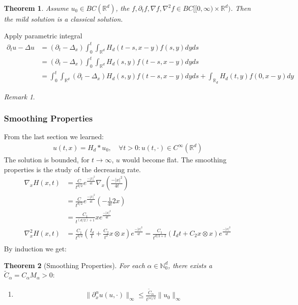 \documentclass[a4paper,11pt,oneside,fleqn]{book}
\newtheorem{theorem}{Theorem}[section]
\theoremstyle{definition}
\theoremstyle{remark}
\newtheorem*{remark}{Remark}
\begin{document}
\begin{theorem}
	Assume $u_0 \in BC(\mathbb{R}^d)$, the $f, \partial_t f, \nabla f, \nabla^2 f \in BC[[0, \infty) \times \mathbb{R}^d)$. Then the mild solution is a classical solution.
\end{theorem}
Apply parametric integral
\begin{align*}
	\partial_t u - \Delta u &= (\partial_t - \Delta_x) \int_0^t \int_{\mathbb{R}^d} H_d(t - s, x - y) f(s, y) dy ds\\
	&= (\partial_t - \Delta_x) \int_0^t \int_{\mathbb{R}^d}
	   H_d(s, y) f(t - s, x -y)dy ds\\
	&= \int_0^t \int_{\mathbb{R}^d} (\partial_t - \Delta_x)H_d(s, y)f(t-s, x-y)dyds + \int_{\mathbb{R}_d}H_d(t, y)f(0, x-y)dy 
\end{align*}
\begin{remark}
\end{remark}


\subsubsection{Smoothing Properties}
From the last section we learned:
\begin{align*}
	u(t, x) = H_d * u_0,\quad \forall t >0: u(t, \cdot) \in C^\infty(\mathbb{R}^d)
\end{align*}
The solution is bounded, for $t \rightarrow \infty$, $u$ would become flat. The smoothing properties is the study of the decreasing rate.
\begin{align*}
	\nabla_x H(x, t) &= \frac{C}{t^{d/2}} e^{\frac{-|x|^2}{4t}} \nabla_x (\frac{-|x|^2}{4t})\\
	&= \frac{C}{t^{d/2}} e^{\frac{-|x|^2}{4t}}(-\frac{1}{4t}2x)\\
	&= \frac{C_1}{t^{(d/2)+ 1}} x e^{\frac{-|x|^2}{4t}}\\
	\nabla^2_x H(x, t)
	&= \frac{C_1}{t^{d/2}}(\frac{I_d}{t} + \frac{C_2}{t^2} x \otimes x) e^{\frac{-|x|^2}{4t}} = \frac{C_1}{t^{d/2 + 2}}(I_d t + C_2 x \otimes x) e^{\frac{-|x|^2}{4t}} \\
\end{align*}
By induction we get:


\begin{theorem}[Smoothing Properties]
	For each $\alpha \in \mathbb{N}_0^d$, there exists a $\tilde{C}_\alpha = C_\alpha M_\alpha > 0:$
	\begin{enumerate}
		\item
		\begin{align*}
			\|\partial_x^\alpha u(u, \cdot)\|_\infty \leq
			\frac{\tilde{C}_\alpha}{t^{|\alpha|/2}} \|u_0\|_\infty
		\end{align*}
	\end{enumerate}
\end{theorem}
\end{document}
